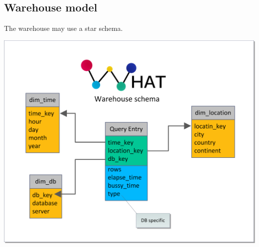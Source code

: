 \subsection{Warehouse model}
The warehouse may use a star schema.
\begin{center}
\includegraphics[width=1\linewidth]{Pictures/WareHouseSchema.png}
\end{center}   
